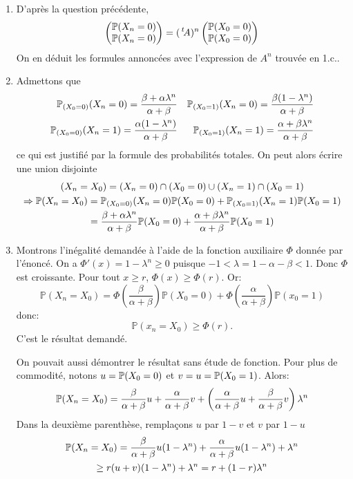 \begin{enumerate}
\begin{enumerate}
  \item D'après la question précédente,
\begin{displaymath}
 \begin{pmatrix}
\mathbb{P}(X_{n}=0) \\ \mathbb{P}(X_{n}=0)
 \end{pmatrix}
 = (\,\mathstrut^t\!{A})^n
 \begin{pmatrix}
\mathbb{P}(X_{0}=0) \\ \mathbb{P}(X_{0}=0) 
 \end{pmatrix}
\end{displaymath}
On en déduit les formules annoncées avec l'expression de $A^n$ trouvée en 1.c..

  \item Admettons que 
\begin{align*}
 \mathbb{P}_{(X_0=0)}(X_n=0) = \frac{\beta + \alpha \lambda^n}{\alpha +\beta} & & \mathbb{P}_{(X_0=1)}(X_n=0) = \frac{\beta(1- \lambda^n)}{\alpha +\beta} \\
 \mathbb{P}_{(X_0=0)}(X_n=1) = \frac{\alpha(1- \lambda^n)}{\alpha +\beta} & & \mathbb{P}_{(X_0=1)}(X_n=1) = \frac{\alpha + \beta \lambda^n}{\alpha +\beta}
\end{align*}
ce qui est justifié par la formule des probabilités totales. On peut alors écrire une union disjointe
\begin{multline*}
 (X_n = X_0) = (X_n = 0)\cap(X_0=0) \cup (X_n=1)\cap(X_0=1)\\
 \Rightarrow
 \mathbb{P}(X_n = X_0) =
 \mathbb{P}_{(X_0 = 0)}(X_n = 0) \mathbb{P}(X_0 = 0) + \mathbb{P}_{(X_0 = 1)}(X_n = 1) \mathbb{P}(X_0 = 1) \\
 = \frac{\beta + \alpha \lambda^n}{\alpha +\beta} \mathbb{P}(X_0 = 0) + \frac{\alpha + \beta \lambda^n}{\alpha +\beta}\mathbb{P}(X_0 = 1)
\end{multline*}

  \item Montrons l'inégalité demandée à l'aide de la fonction auxiliaire $\Phi$ donnée par l'énoncé. On a $\Phi'(x) = 1-\lambda^{n}\geq 0$ puisque $-1< \lambda = 1-\alpha - \beta < 1$. Donc $\Phi$ est croissante. Pour tout $x\geq r$, $\Phi(x)\geq \Phi(r)$. Or:
  \[ \mathbb{P}(X_{n} = X_{0}) = \Phi \left ( \frac{\beta}{\alpha + \beta}\right )\mathbb{P}(X_{0}=0) + \Phi\left ( \frac{\alpha}{\alpha + \beta}\right )\mathbb{P}(x_{0}=1)\]
  donc:
  \[ \mathbb{P}(x_{n}=X_{0}) \geq \Phi(r).\]
 C'est le résultat demandé.
 
 
 On pouvait aussi démontrer le résultat sans étude de fonction. Pour plus de commodité, notons $u = \mathbb{P}(X_0 = 0)$ et $v=u = \mathbb{P}(X_0 = 1)$. Alors:
\begin{displaymath}
 \mathbb{P}(X_n = X_0) = \frac{\beta}{\alpha + \beta}u + \frac{\alpha}{\alpha + \beta}v +  \left(\frac{\alpha}{\alpha + \beta}u + \frac{\beta}{\alpha + \beta}v \right)\lambda^n 
\end{displaymath}
Dans la deuxième parenthèse, remplaçons $u$ par $1-v$ et $v$ par $1-u$
\begin{multline*}
 \mathbb{P}(X_n = X_0) = \frac{\beta}{\alpha + \beta}u(1-\lambda^n) + \frac{\alpha}{\alpha + \beta}u(1-\lambda^n) + \lambda^n \\
 \geq r(u+v)(1-\lambda^n) + \lambda^n = r + (1-r)\lambda^n
\end{multline*}


\end{enumerate}
\end{enumerate}
